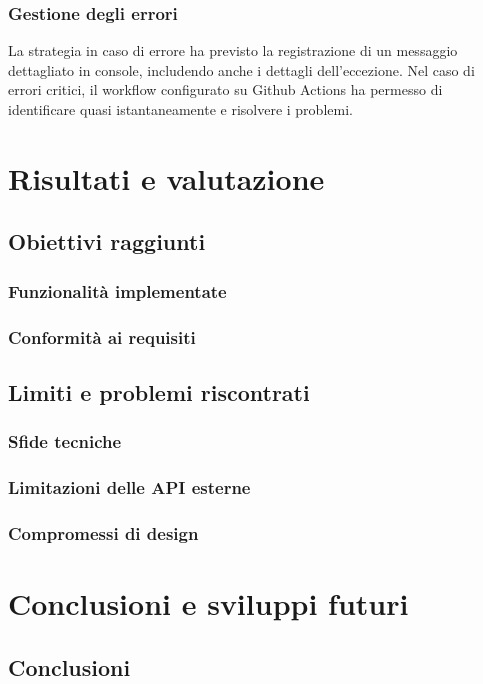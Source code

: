 \documentclass[12pt,a4paper,oneside]{report}
\begin{document}
\subsection{Gestione degli errori}
La strategia in caso di errore ha previsto la registrazione di un messaggio dettagliato in console, includendo anche i dettagli dell'eccezione.
Nel caso di errori critici, il workflow configurato su Github Actions ha permesso di identificare quasi istantaneamente e risolvere i problemi.



\chapter{Risultati e valutazione}
\section{Obiettivi raggiunti}
\subsection{Funzionalità implementate}

\subsection{Conformità ai requisiti}

\section{Limiti e problemi riscontrati}
\subsection{Sfide tecniche}

\subsection{Limitazioni delle API esterne}

\subsection{Compromessi di design}




\chapter{Conclusioni e sviluppi futuri}
\section{Conclusioni}
\end{document}
